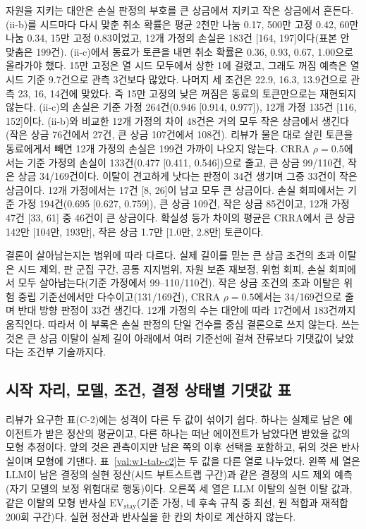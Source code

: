 자원을 지키는 대안은 손실 판정의 부호를 큰 상금에서 지키고 작은 상금에서 흔든다. (ii-b)를 시드마다 다시 맞춘 취소 확률은 평균 2천만 나눔 0.17, 500만 고정 0.42, 60만 나눔 0.34, 15만 고정 0.83이었고, 12개 가정의 손실은 183건 [164, 197]이다(표본 안 맞춤은 199건). (ii-c)에서 동료가 토큰을 내면 취소 확률은 0.36, 0.93, 0.67, 1.00으로 올라가야 했다. 15만 고정은 열 시드 모두에서 상한 1에 걸렸고, 그래도 꺼짐 예측은 열 시드 기준 9.7건으로 관측 3건보다 많았다. 나머지 세 조건은 22.9, 16.3, 13.9건으로 관측 23, 16, 14건에 맞았다. 즉 15만 고정의 낮은 꺼짐은 동료의 토큰만으로는 재현되지 않는다. (ii-c)의 손실은 기준 가정 264건(0.946 [0.914, 0.977]), 12개 가정 135건 [116, 152]이다. (ii-b)와 비교한 12개 가정의 차이 48건은 거의 모두 작은 상금에서 생긴다(작은 상금 76건에서 27건, 큰 상금 107건에서 108건). 리뷰가 물은 대로 살린 토큰을 동료에게서 빼면 12개 가정의 손실은 199건 가까이 나오지 않는다. CRRA $\rho=0.5$에서는 기준 가정의 손실이 133건(0.477 [0.411, 0.546])으로 줄고, 큰 상금 99/110건, 작은 상금 34/169건이다. 이탈이 견고하게 낫다는 판정이 34건 생기며 그중 33건이 작은 상금이다. 12개 가정에서는 17건 [8, 26]이 남고 모두 큰 상금이다. 손실 회피에서는 기준 가정 194건(0.695 [0.627, 0.759]), 큰 상금 109건, 작은 상금 85건이고, 12개 가정 47건 [33, 61] 중 46건이 큰 상금이다. 확실성 등가 차이의 평균은 CRRA에서 큰 상금 142만 [104만, 193만], 작은 상금 1.7만 [1.0만, 2.8만] 토큰이다.

결론이 살아남는지는 범위에 따라 다르다. 실제 길이를 믿는 큰 상금 조건의 초과 이탈은 시드 제외, 판 군집 구간, 공통 지지범위, 자원 보존 재보정, 위험 회피, 손실 회피에서 모두 살아남는다(기준 가정에서 99--110/110건). 작은 상금 조건의 초과 이탈은 위험 중립 기준선에서만 다수이고(131/169건), CRRA $\rho=0.5$에서는 34/169건으로 줄며 반대 방향 판정이 33건 생긴다. 12개 가정의 수는 대안에 따라 17건에서 183건까지 움직인다. 따라서 이 부록은 손실 판정의 단일 건수를 중심 결론으로 쓰지 않는다. 쓰는 것은 큰 상금 이탈이 실제 길이 아래에서 여러 기준선에 걸쳐 잔류보다 기댓값이 낮았다는 조건부 기술까지다.

\subsection{시작 자리, 모델, 조건, 결정 상태별 기댓값 표}\label{val:w1-cells}

리뷰가 요구한 표(C-2)에는 성격이 다른 두 값이 섞이기 쉽다. 하나는 실제로 남은 에이전트가 받은 정산의 평균이고, 다른 하나는 떠난 에이전트가 남았다면 받았을 값의 모형 추정이다. 앞의 것은 관측이지만 남은 쪽의 이후 선택을 포함하고, 뒤의 것은 반사실이며 모형에 기댄다. 표~\ref{val:w1-tab-c2}는 두 값을 다른 열로 나누었다. 왼쪽 세 열은 LLM이 남은 결정의 실현 정산(시드 부트스트랩 구간)과 같은 결정의 시드 제외 예측(자기 모델의 보정 위험대로 행동)이다. 오른쪽 세 열은 LLM 이탈의 실현 이탈 값과, 같은 이탈의 모형 반사실 $\mathrm{EV}_{\mathrm{stay}}$(기준 가정, 네 후속 규칙 중 최선, 원 적합과 재적합 200회 구간)다. 실현 정산과 반사실을 한 칸의 차이로 계산하지 않는다.


